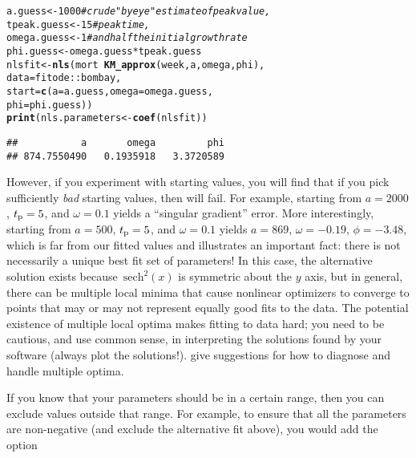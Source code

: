 \documentclass[]{interact}\usepackage[]{graphicx}\usepackage[]{xcolor}
\makeatletter
\newcommand{\hlnum}[1]{\textcolor[rgb]{0.686,0.059,0.569}{#1}}%
\newcommand{\hlcom}[1]{\textcolor[rgb]{0.678,0.584,0.686}{\textit{#1}}}%
\newcommand{\hlopt}[1]{\textcolor[rgb]{0,0,0}{#1}}%
\newcommand{\hlstd}[1]{\textcolor[rgb]{0.345,0.345,0.345}{#1}}%
\newcommand{\hlkwb}[1]{\textcolor[rgb]{0.69,0.353,0.396}{#1}}%
\newcommand{\hlkwc}[1]{\textcolor[rgb]{0.333,0.667,0.333}{#1}}%
\newcommand{\hlkwd}[1]{\textcolor[rgb]{0.737,0.353,0.396}{\textbf{#1}}}%
\newenvironment{kframe}{%
 \def\at@end@of@kframe{}%
 \ifinner\ifhmode%
  \def\at@end@of@kframe{\end{minipage}}%
  \begin{minipage}{\columnwidth}%
 \fi\fi%
 \def\FrameCommand##1{\hskip\@totalleftmargin \hskip-\fboxsep
 \colorbox{shadecolor}{##1}\hskip-\fboxsep
     \hskip-\linewidth \hskip-\@totalleftmargin \hskip\columnwidth}%
 \MakeFramed {\advance\hsize-\width
   \@totalleftmargin\z@ \linewidth\hsize
   \@setminipage}}%
 {\par\unskip\endMakeFramed%
 \at@end@of@kframe}
\newenvironment{knitrout}{}{} %
\theoremstyle{plain}%
\theoremstyle{definition}
\theoremstyle{remark}
\newcommand{\sech}{\,\textrm{sech}}
\newcommand{\tpeak}{t_{\rm p}}
\newcommand{\code}[1]{\texttt{\detokenize{#1}}}
\makeatother
\begin{document}
\begin{knitrout}
\color{fgcolor}\begin{kframe}
\begin{alltt}
\hlstd{a.guess} \hlkwb{<-} \hlnum{1000}    \hlcom{# crude "by eye" estimate of peak value,}
\hlstd{tpeak.guess} \hlkwb{<-} \hlnum{15}  \hlcom{# peak time,}
\hlstd{omega.guess} \hlkwb{<-} \hlnum{1}   \hlcom{# and half the initial growth rate}
\hlstd{phi.guess} \hlkwb{<-} \hlstd{omega.guess} \hlopt{*} \hlstd{tpeak.guess}
\hlstd{nlsfit} \hlkwb{<-} \hlkwd{nls}\hlstd{(mort} \hlopt{~} \hlkwd{KM_approx}\hlstd{(week, a, omega, phi),}
              \hlkwc{data} \hlstd{= fitode}\hlopt{::}\hlstd{bombay,}
              \hlkwc{start} \hlstd{=} \hlkwd{c}\hlstd{(}\hlkwc{a} \hlstd{= a.guess,} \hlkwc{omega} \hlstd{= omega.guess,}
                        \hlkwc{phi} \hlstd{= phi.guess))}
\hlkwd{print}\hlstd{(nls.parameters} \hlkwb{<-} \hlkwd{coef}\hlstd{(nlsfit))}
\end{alltt}
\begin{verbatim}
##           a       omega         phi 
## 874.7550490   0.1935918   3.3720589
\end{verbatim}
\end{kframe}
\end{knitrout}

\noindent
However, if you experiment with starting values, you will find that if
you pick sufficiently \emph{bad} starting values, then \code{nls} will
fail.  For example, starting from $a=2000$, $\tpeak=5$, and
$\omega=0.1$ yields a ``singular gradient'' error.  More
interestingly, starting from $a=500$, $\tpeak=5$, and $\omega=0.1$
yields $a=869$, $\omega=-0.19$, $\phi=-3.48$, which is far from our
fitted values and illustrates an important fact: there is not
necessarily a unique best fit set of parameters!  In this case, the
alternative solution exists because $\sech^2(x)$ is symmetric about
the $y$ axis, but in general, there can be multiple local minima that
cause nonlinear optimizers to converge to points that may or may not
represent equally good fits to the data.  The potential existence of
multiple local optima makes fitting to data hard; you need to be
cautious, and use common sense, in interpreting the solutions found by
your software (always plot the solutions!). \citet{raue2013lessons}
give suggestions for how to diagnose and handle multiple optima.

If you know that your parameters should be in a certain range, then
you can exclude values outside that range.  For example, to ensure
that all the parameters are non-negative (and exclude the alternative
fit above), you would add the \code{nls} option
\end{document}
